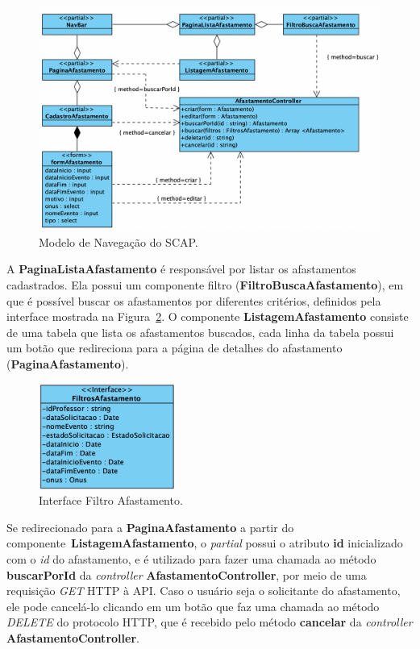 \begin{figure}[h!]
    \centering
    \includegraphics[width=1\textwidth]{figuras/fig-modelo-naveg-afast.png}
    \caption{Modelo de Navegação do SCAP.}
    \label{fig-modelo-navegacao-afast}
\end{figure}

A \textbf{PaginaListaAfastamento} é responsável por listar os afastamentos cadastrados.
Ela possui um componente filtro (\textbf{FiltroBuscaAfastamento}), em que é possível buscar
os afastamentos por diferentes critérios, definidos pela interface mostrada na Figura~\ref{fig-interface-filtro-afast}.
O componente \textbf{ListagemAfastamento} consiste de uma tabela que lista os afastamentos buscados,
cada linha da tabela possui um botão que redireciona para a página de detalhes do afastamento (\textbf{PaginaAfastamento}).

\begin{figure}[h!]
    \centering
    \includegraphics[width=0.4\textwidth]{figuras/fig-interface-filtro-afast.png}
    \caption{Interface Filtro Afastamento.}
    \label{fig-interface-filtro-afast}
\end{figure}

Se redirecionado para a \textbf{PaginaAfastamento} a partir do componente~\textbf{ListagemAfastamento},
o \textit{partial} possui o atributo \textbf{id} inicializado com o \textit{id} do afastamento, e é
utilizado para fazer uma chamada ao método \textbf{buscarPorId} da \textit{controller} \textbf{AfastamentoController}, por
meio de uma requisição \textit{GET} HTTP à API.
Caso o usuário seja o solicitante do afastamento, ele pode cancelá-lo clicando em um botão que faz uma chamada ao método \textit{DELETE}
do protocolo HTTP, que é recebido pelo método \textbf{cancelar} da \textit{controller} \textbf{AfastamentoController}.

